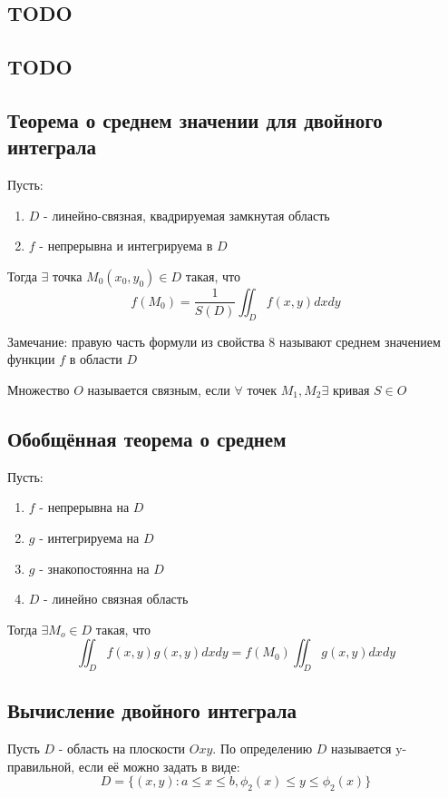 \documentclass[a4paper, 12pt]{report}
\begin{document}
		\subsection{TODO}
		\subsection{TODO}
		\subsection{Теорема о среднем значении для двойного интеграла} 
			Пусть:
			\begin{enumerate}
				\item $D$ - линейно-связная, квадрируемая замкнутая область
				\item $f$ - непрерывна и интегрируема в $D$
			\end{enumerate}
		
			Тогда $\exists$ точка $M_0(x_0, y_0)\in D$ такая, что
			\begin{equation}
				f(M_0)=\frac{1}{S(D)}\iint_{D}f(x, y)dxdy
			\end{equation}
			
			Замечание: правую часть формули из свойства 8 называют среднем значением функции $f$ в области $D$
			
			Множество $O$ называется связным, если $\forall$ точек $M_1, M_2 \exists$ кривая $S\in O$
		\subsection{Обобщённая теорема о среднем}
			Пусть:
			\begin{enumerate}
				\item $f$ - непрерывна на $D$
				\item $g$ - интегрируема на $D$
				\item $g$ - знакопостоянна на $D$
				\item $D$ - линейно связная область
			\end{enumerate}
			
			Тогда $\exists M_o\in D$ такая, что
			\begin{equation}
				\iint_{D}f(x,y)g(x,y)dxdy=f(M_0)\iint_{D}g(x,y)dxdy
			\end{equation}
		\subsection{Вычисление двойного интеграла}
			Пусть $D$ - область на плоскости $Oxy$. По определению $D$ называется y-правильной, если её можно задать в виде:
			\begin{equation}
				\label{eq:vid}
				D=\{(x, y): a \le x \le b, \phi_2(x)\le y\le\phi_2(x)\}
			\end{equation}
			
\end{document}
